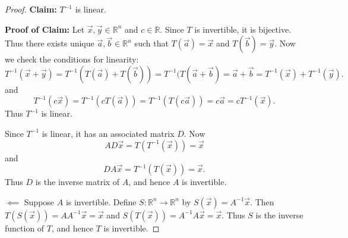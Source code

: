 \documentclass[12pt,letterpaper]{article}
\begin{document}
\begin{enumerate}
\begin{proof}
  {\bf Claim:} $T^{-1}$ is linear.
  
  {\bf Proof of Claim:} Let $\vec{x}, \vec{y} \in \mathbb{R}^n$ and $c \in \mathbb{R}$. Since $T$ is invertible, it is bijective. Thus there exists unique $\vec{a}, \vec{b} \in \mathbb{R}^n$ such that $T(\vec{a})=\vec{x}$ and $T(\vec{b})=\vec{y}$. Now we check the conditions for linearity: $$T^{-1}(\vec{x}+\vec{y})=T^{-1}(T(\vec{a})+T(\vec{b}))=T^{-1}(T(\vec{a}+\vec{b})=\vec{a}+\vec{b}=T^{-1}(\vec{x})+T^{-1}(\vec{y}).$$ and $$T^{-1}(c\vec{x})=T^{-1}(c T(\vec{a}))=T^{-1}(T(c\vec{a}))=c \vec{a} = c T^{-1}(\vec{x}).$$ Thus $T^{-1}$ is linear.
  
  Since $T^{-1}$ is linear, it has an associated matrix $D$. Now $$AD\vec{x} =T(T^{-1}(\vec{x}))=\vec{x}$$ and $$DA\vec{x} =T^{-1}(T(\vec{x})) =\vec{x}.$$ Thus $D$ is the inverse matrix of $A$, and hence $A$ is invertible. 
  
  $\impliedby$ Suppose $A$ is invertible. Define $S: \mathbb{R}^n \to \mathbb{R}^n$ by $S(\vec{x})=A^{-1}\vec{x}$. Then $T(S(\vec{x}))=AA^{-1}\vec{x} = \vec{x}$ and $S(T(\vec{x})) =A^{-1}A\vec{x}=\vec{x}$. Thus $S$ is the inverse function of $T$, and hence $T$ is invertible. 
  \end{proof}
\end{enumerate}
\end{document}
